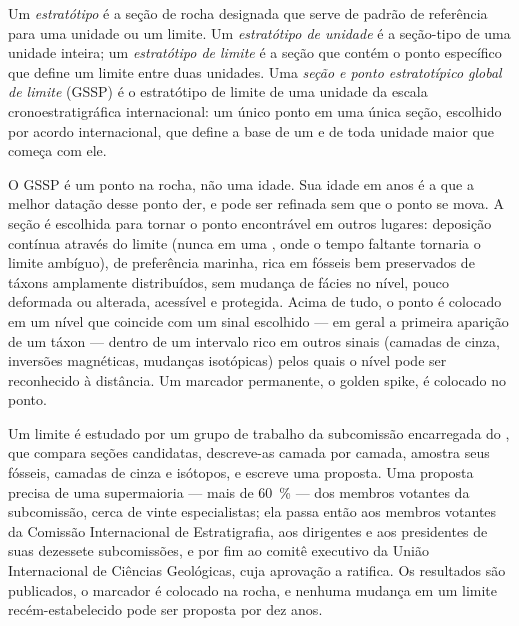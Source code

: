 \begin{definition}\label{def:b1:stratigraphic-scale:gssp}
Um \emph{estratótipo} é a seção de rocha designada que serve de padrão de
referência para uma unidade ou um limite. Um \emph{estratótipo de unidade} é a seção-tipo de uma unidade inteira; um \emph{estratótipo de limite} é a seção que contém o ponto específico que define um limite entre duas unidades. Uma
\emph{seção e ponto estratotípico global de limite} (GSSP) é o estratótipo de limite de uma unidade da escala cronoestratigráfica
internacional: um único ponto em uma única seção, escolhido por acordo internacional, que define
a base de um  e de toda unidade maior que começa com ele.
\end{definition}

O GSSP é um ponto na rocha, não uma idade. Sua idade em anos é a que a melhor datação desse
ponto der, e pode ser refinada sem que o ponto se mova. A seção é escolhida para tornar o ponto
encontrável em outros lugares: deposição contínua através do limite (nunca em uma ,
onde o tempo faltante tornaria o limite ambíguo), de preferência marinha, rica em fósseis bem
preservados de táxons amplamente distribuídos, sem mudança de fácies no nível, pouco deformada
ou alterada, acessível e protegida. Acima de tudo, o ponto é colocado em um nível que coincide
com um sinal escolhido --- em geral a primeira aparição de um táxon --- dentro de um intervalo
rico em outros sinais (camadas de cinza, inversões magnéticas, mudanças isotópicas) pelos quais
o nível pode ser reconhecido à distância. Um marcador permanente, o golden spike, é colocado
no ponto.

\begin{inthefield}
Um limite é estudado por um grupo de trabalho da subcomissão encarregada do , que
compara seções candidatas, descreve-as camada por camada, amostra seus fósseis, camadas de cinza
e isótopos, e escreve uma proposta. Uma proposta precisa de uma supermaioria --- mais de
\qty{60}{\%} --- dos membros votantes da subcomissão, cerca de vinte especialistas; ela passa
então aos membros votantes da Comissão Internacional de Estratigrafia, aos dirigentes e aos
presidentes de suas dezessete subcomissões, e por fim ao comitê executivo da União Internacional
de Ciências Geológicas, cuja aprovação a ratifica. Os resultados são publicados, o marcador é
colocado na rocha, e nenhuma mudança em um limite recém-estabelecido pode ser proposta por dez anos.
\end{inthefield}

